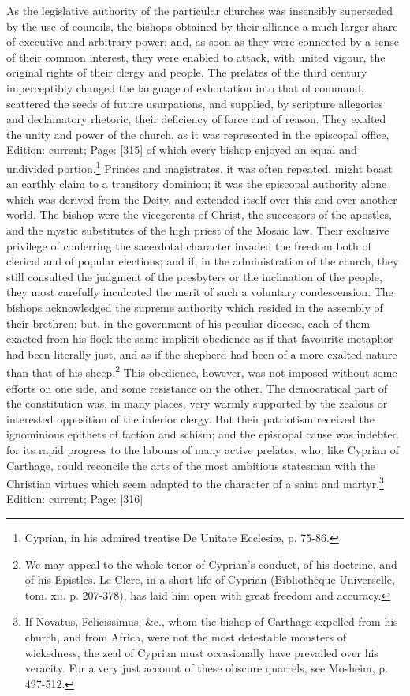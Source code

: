As the legislative authority of the particular churches was insensibly superseded by the use of councils, the bishops obtained by their alliance a much larger share of executive and arbitrary power; and, as soon as they were connected by a sense of their common interest, they were enabled to attack, with united vigour, the original rights of their clergy and people. The prelates of the third century imperceptibly changed the language of exhortation into that of command, scattered the seeds of future usurpations, and supplied, by scripture allegories and declamatory rhetoric, their deficiency of force and of reason. They exalted the unity and power of the church, as it was represented in the episcopal office, Edition: current; Page: [315] of which every bishop enjoyed an equal and undivided portion.\footnote{Cyprian, in his admired treatise De Unitate Ecclesiæ, p. 75-86.} Princes and magistrates, it was often repeated, might boast an earthly claim to a transitory dominion; it was the episcopal authority alone which was derived from the Deity, and extended itself over this and over another world. The bishop were the vicegerents of Christ, the successors of the apostles, and the mystic substitutes of the high priest of the Mosaic law. Their exclusive privilege of conferring the sacerdotal character invaded the freedom both of clerical and of popular elections; and if, in the administration of the church, they still consulted the judgment of the presbyters or the inclination of the people, they most carefully inculcated the merit of such a voluntary condescension. The bishops acknowledged the supreme authority which resided in the assembly of their brethren; but, in the government of his peculiar diocese, each of them exacted from his flock the same implicit obedience as if that favourite metaphor had been literally just, and as if the shepherd had been of a more exalted nature than that of his sheep.\footnote{We may appeal to the whole tenor of Cyprian\texthebrew{}’s conduct, of his doctrine, and of his Epistles. Le Clerc, in a short life of Cyprian (Bibliothèque Universelle, tom. xii. p. 207-378), has laid him open with great freedom and accuracy.} This obedience, however, was not imposed without some efforts on one side, and some resistance on the other. The democratical part of the constitution was, in many places, very warmly supported by the zealous or interested opposition of the inferior clergy. But their patriotism received the ignominious epithets of faction and schism; and the episcopal cause was indebted for its rapid progress to the labours of many active prelates, who, like Cyprian of Carthage, could reconcile the arts of the most ambitious statesman with the Christian virtues which seem adapted to the character of a saint and martyr.\footnote{If Novatus, Felicissimus, \&c., whom the bishop of Carthage expelled from his church, and from Africa, were not the most detestable monsters of wickedness, the zeal of Cyprian must occasionally have prevailed over his veracity. For a very just account of these obscure quarrels, see Mosheim, p. 497-512.}
Edition: current; Page: [316]

